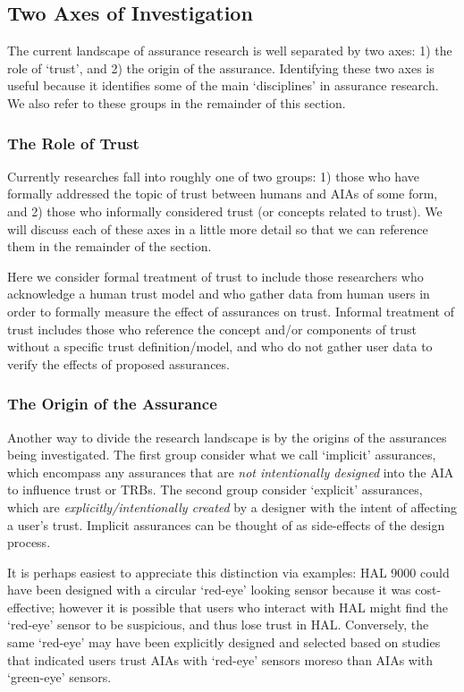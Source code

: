 \subsection{Two Axes of Investigation}
The current landscape of assurance research is well separated by two axes: 1) the role of `trust', and 2) the origin of the assurance. Identifying these two axes is useful because it identifies some of the main `disciplines' in assurance research. We also refer to these groups in the remainder of this section.

\subsubsection{The Role of Trust}
Currently researches fall into roughly one of two groups: 1) those who have formally addressed the topic of trust between humans and AIAs of some form, and 2) those who informally considered trust (or concepts related to trust). We will discuss each of these axes in a little more detail so that we can reference them in the remainder of the section.

Here we consider formal treatment of trust to include those researchers who acknowledge a human trust model and who gather data from human users in order to formally measure the effect of assurances on trust. Informal treatment of trust includes those who reference the concept and/or components of trust without a specific trust definition/model, and who do not gather user data to verify the effects of proposed assurances. 

\subsubsection{The Origin of the Assurance}
Another way to divide the research landscape is by the origins of the assurances being investigated. The first group consider what we call `implicit' assurances, which encompass any assurances that are \emph{not intentionally designed} into the AIA to influence trust or TRBs. The second group consider `explicit' assurances, which are \emph{explicitly/intentionally created} by a designer with the intent of affecting a user's trust. Implicit assurances can be thought of as side-effects of the design process.

It is perhaps easiest to appreciate this distinction via examples: HAL 9000 could have been designed with a circular `red-eye' looking sensor because it was cost-effective; however it is possible that users who interact with HAL might find the `red-eye' sensor to be suspicious, and thus lose trust in HAL. Conversely, the same `red-eye' may have been explicitly designed and selected based on studies that indicated users trust AIAs with `red-eye' sensors moreso than AIAs with `green-eye' sensors.

